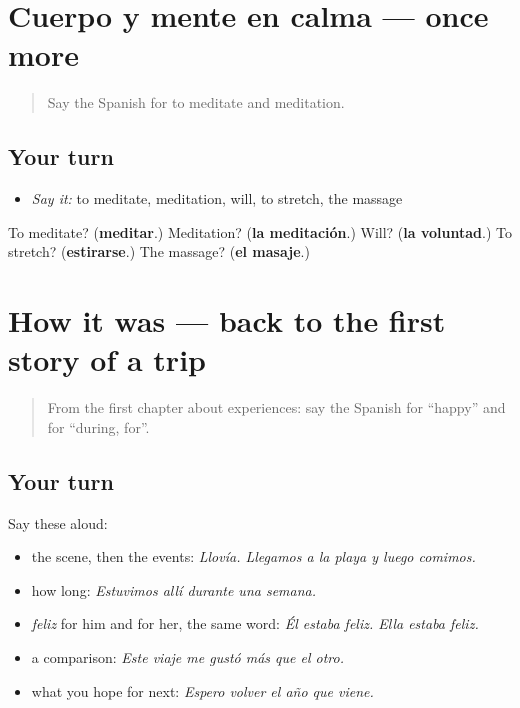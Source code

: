 \section[(dialogue)]{Cuerpo y mente en calma — once more}

\label{lesson:ES-R767-repaso-final-767}



\begin{quote}
Say the Spanish for to meditate and meditation.
\end{quote}

\subsection*{Your turn}
\begin{itemize}
\raggedright
  \item \emph{Say it:} to meditate, meditation, will, to stretch, the massage
\end{itemize}

\begin{tcolorbox}[breakable,colback=teal!4,colframe=teal!35!black,title={Before you move on}]
To meditate? (\textbf{meditar}.) Meditation? (\textbf{la meditación}.) Will? (\textbf{la voluntad}.) To stretch? (\textbf{estirarse}.) The massage? (\textbf{el masaje}.)
\end{tcolorbox}
\section[(dialogue)]{How it was — back to the first story of a trip}

\label{lesson:ES-R767-repaso-como-fue}



\begin{quote}
From the first chapter about experiences: say the Spanish for \textquotedblleft{}happy\textquotedblright{} and for \textquotedblleft{}during, for\textquotedblright{}.
\end{quote}

\subsection*{Your turn}
Say these aloud:

\begin{itemize}
\raggedright
  \item the scene, then the events: \emph{Llovía. Llegamos a la playa y luego comimos.}
  \item how long: \emph{Estuvimos allí durante una semana.}
  \item \emph{feliz} for him and for her, the same word: \emph{Él estaba feliz. Ella estaba feliz.}
  \item a comparison: \emph{Este viaje me gustó más que el otro.}
  \item what you hope for next: \emph{Espero volver el año que viene.}
\end{itemize}

